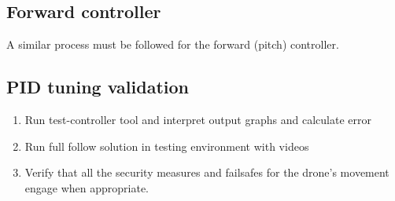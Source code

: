 \subsection{Forward controller}

A similar process must be followed for the forward (pitch) controller.






\subsection{PID tuning validation}

\begin{enumerate}
    \item Run test-controller tool and interpret output graphs and calculate error 
    \item Run full follow solution in testing environment with videos
    \item Verify that all the security measures and failsafes for the drone's movement engage when appropriate.
\end{enumerate}

